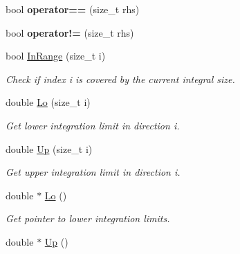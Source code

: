 \begin{DoxyCompactItemize}
\item 
\hypertarget{classIntegral_a114cf52f7967e3595d92f1e3c0bc4681}{}bool {\bfseries operator==} (size\+\_\+t rhs)\label{classIntegral_a114cf52f7967e3595d92f1e3c0bc4681}

\item 
\hypertarget{classIntegral_affe5fc13694efa8b91f1aa4266ca23c3}{}bool {\bfseries operator!=} (size\+\_\+t rhs)\label{classIntegral_affe5fc13694efa8b91f1aa4266ca23c3}

\item 
\hypertarget{classIntegral_a7b7f60c30e769eedb0d7ecbf5f393fa0}{}bool \hyperlink{classIntegral_a7b7f60c30e769eedb0d7ecbf5f393fa0}{In\+Range} (size\+\_\+t i)\label{classIntegral_a7b7f60c30e769eedb0d7ecbf5f393fa0}

\begin{DoxyCompactList}\small\item\em Check if index i is covered by the current integral size. \end{DoxyCompactList}\item 
\hypertarget{classIntegral_a3cb1093faf75a75b2024d865dc1e1d4a}{}double \hyperlink{classIntegral_a3cb1093faf75a75b2024d865dc1e1d4a}{Lo} (size\+\_\+t i)\label{classIntegral_a3cb1093faf75a75b2024d865dc1e1d4a}

\begin{DoxyCompactList}\small\item\em Get lower integration limit in direction i. \end{DoxyCompactList}\item 
\hypertarget{classIntegral_a44b55ae610a5910d706acd88d13896da}{}double \hyperlink{classIntegral_a44b55ae610a5910d706acd88d13896da}{Up} (size\+\_\+t i)\label{classIntegral_a44b55ae610a5910d706acd88d13896da}

\begin{DoxyCompactList}\small\item\em Get upper integration limit in direction i. \end{DoxyCompactList}\item 
\hypertarget{classIntegral_a891fceeeac3a1c8475955c91fddfc69d}{}double $\ast$ \hyperlink{classIntegral_a891fceeeac3a1c8475955c91fddfc69d}{Lo} ()\label{classIntegral_a891fceeeac3a1c8475955c91fddfc69d}

\begin{DoxyCompactList}\small\item\em Get pointer to lower integration limits. \end{DoxyCompactList}\item 
\hypertarget{classIntegral_a8610f52e6f7540048afa5714fd5f6748}{}double $\ast$ \hyperlink{classIntegral_a8610f52e6f7540048afa5714fd5f6748}{Up} ()\label{classIntegral_a8610f52e6f7540048afa5714fd5f6748}


\end{DoxyCompactItemize}
